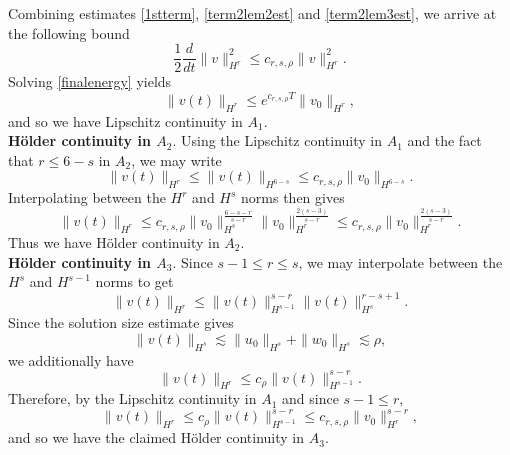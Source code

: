 \documentclass[reqno]{amsart}
\theoremstyle{plain}
\numberwithin{equation}{section}
\begin{document}
Combining estimates \eqref{1stterm}, \eqref{term2lem2est} and \eqref{term2lem3est}, we arrive at the following bound
\begin{equation}\label{finalenergy}
    \frac{1}{2}\frac{d}{dt}\|v\|^2_{H^r} \leq c_{r,s,\rho}\|v\|^2_{H^r}.
\end{equation}
Solving \eqref{finalenergy} yields 
\begin{equation}
    \|v(t)\|_{H^r} \leq e^{c_{r,s,\rho}T}\|v_0\|_{H^r},
\end{equation}
and so we have Lipschitz continuity in $A_1.$ \\

\textbf{H\"older continuity in $A_2.$}
Using the Lipschitz continuity in $A_1$ and the fact that $r \leq 6-s$ in $A_2$, we may write
\begin{equation}
    \|v(t)\|_{H^r} \leq \|v(t)\|_{H^{6-s}} \leq c_{r,s,\rho}\|v_0\|_{H^{6-s}}.
\end{equation}
Interpolating between the $H^r$ and $H^s$ norms then gives 
\begin{equation}
    \|v(t)\|_{H^r} \leq c_{r,s,\rho}\|v_0\|_{H^s}^{\frac{6-s-r}{s-r}}\|v_0\|_{H^r}^{\frac{2(s-3)}{s-r}} \leq c_{r,s,\rho}\|v_0\|_{H^r}^{\frac{2(s-3)}{s-r}}.
\end{equation}
Thus we have H\"older continuity in $A_2.$ \\ 

\textbf{H\"older continuity in $A_3.$} 
Since $s-1 \leq r \leq s$, we may interpolate between the $H^s$ and $H^{s-1}$ norms to get 
\begin{equation}
    \|v(t)\|_{H^r} \leq  \|v(t)\|_{H^{s-1}}^{s-r}\|v(t)\|_{H^s}^{r-s+1}.
\end{equation}
Since the solution size estimate gives 
\begin{equation}
    \|v(t)\|_{H^s} \lesssim \|u_0\|_{H^{s}} + \|w_0\|_{H^s} \lesssim \rho,
\end{equation}
we additionally have 
\begin{equation}
   \|v(t)\|_{H^r} \leq c_{\rho} \|v(t)\|_{H^{s-1}}^{s-r}.
\end{equation}
Therefore, by the Lipschitz continuity in $A_1$ and since $s-1 \leq r,$
\begin{equation}
    \|v(t)\|_{H^r} 
        \leq c_{\rho} \|v(t)\|_{H^{s-1}}^{s-r} 
            \leq c_{r,s,\rho} \|v_0\|_{H^r}^{s-r},
\end{equation}
and so we have the claimed  H\"older continuity in $A_3.$  
\end{document}
